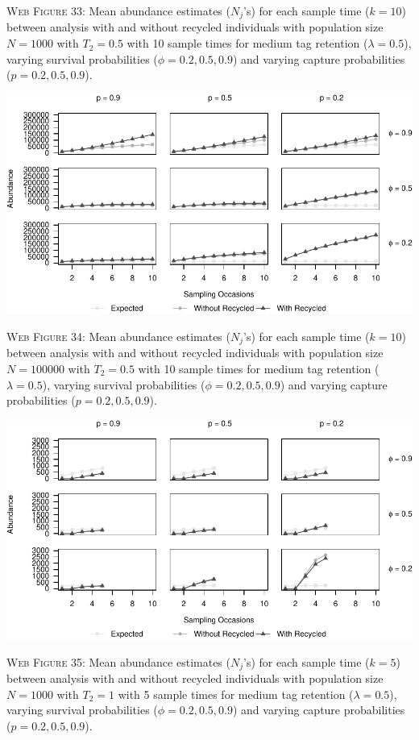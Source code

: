 \documentclass[]{article}
\begin{document}
\textsc{Web Figure 33:} Mean abundance estimates (\(N_j\)'s) for each
sample time (\(k=10\)) between analysis with and without recycled
individuals with population size \(N=1000\) with \(T_2=0.5\) with 10
sample times for medium tag retention (\(\lambda=0.5\)), varying
survival probabilities (\(\phi=0.2,0.5,0.9\)) and varying capture
probabilities (\(p=0.2,0.5,0.9\)).

\includegraphics{Appendix_BW_files/figure-latex/34_abundance_M_GJSTL3-1.pdf}

\textsc{Web Figure 34:} Mean abundance estimates (\(N_j\)'s) for each
sample time (\(k=10\)) between analysis with and without recycled
individuals with population size \(N=100000\) with \(T_2=0.5\) with 10
sample times for medium tag retention (\(\lambda=0.5\)), varying
survival probabilities (\(\phi=0.2,0.5,0.9\)) and varying capture
probabilities (\(p=0.2,0.5,0.9\)).

\newpage

\includegraphics{Appendix_BW_files/figure-latex/35_abundance_M_GJSTL5-1.pdf}

\textsc{Web Figure 35:} Mean abundance estimates (\(N_j\)'s) for each
sample time (\(k=5\)) between analysis with and without recycled
individuals with population size \(N=1000\) with \(T_2=1\) with 5 sample times
for medium tag retention (\(\lambda=0.5\)), varying survival
probabilities (\(\phi=0.2,0.5,0.9\)) and varying capture probabilities
(\(p=0.2,0.5,0.9\)).
\end{document}
